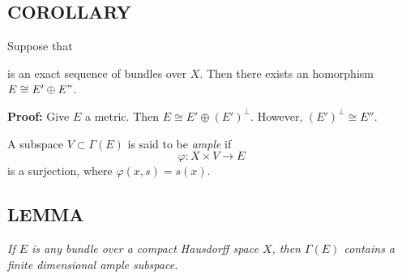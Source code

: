 \subsection{COROLLARY} Suppose that  is an exact sequence of bundles over $X$. Then there exists an homorphism $E \cong E' \oplus E"$. \par 

\textbf{Proof:} Give $E$ a metric. Then $E \cong E' \oplus (E')^\bot$. However, $(E')^\bot \cong E''$. \par \hfill

A subspace $V \subset \Gamma(E)$ is said to be \textit{ample} if
\begin{equation*}
    \varphi: X \times V \to E
\end{equation*}
is a surjection, where $\varphi(x, s) = s(x)$.

\subsection{LEMMA}\label{1.4.12} \textit{If $E$ is any bundle over a compact Hausdorff space $X$, then $\Gamma(E)$ contains a finite dimensional ample subspace.} \par 

